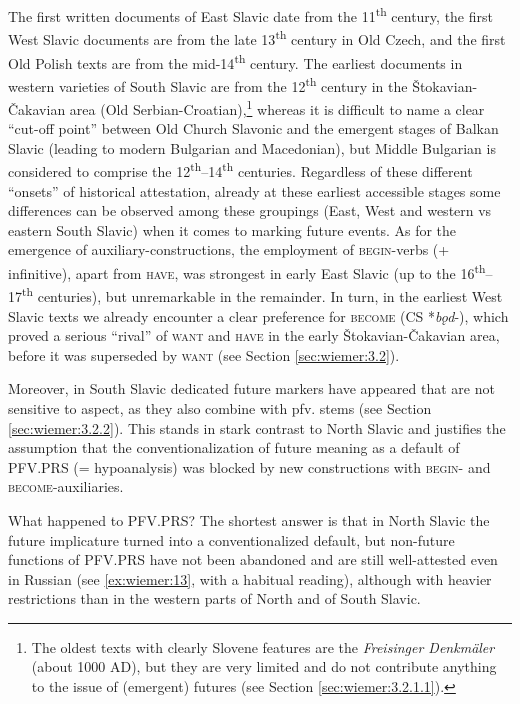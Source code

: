 \documentclass[output=paper,colorlinks,citecolor=brown]{langscibook}
\begin{document}
The first written documents of East Slavic date from the 11\textsuperscript{th} century, the first West Slavic documents are from the late 13\textsuperscript{th} century in Old Czech, and the first Old Polish texts are from the mid-14\textsuperscript{th} century. The earliest documents in western varieties of South Slavic are from the 12\textsuperscript{th} century in the Štokavian-Čakavian area (Old Serbian-Croatian),\footnote{\label{fn:14}The oldest texts with clearly Slovene features are the \textit{Freisinger Denkmäler} (about 1000 AD), but they are very limited and do not contribute anything to the issue of (emergent) futures (see Section \ref{sec:wiemer:3.2.1.1}).} whereas it is difficult to name a clear “cut-off point” between Old Church Slavonic and the emergent stages of Balkan Slavic (leading to modern Bulgarian and Macedonian), but Middle Bulgarian is considered to comprise the 12\textsuperscript{th}--14\textsuperscript{th} centuries. Regardless of these different “onsets” of historical attestation, already at these earliest accessible stages some differences can be observed among these groupings (East, West and western vs eastern South Slavic) when it comes to marking future events. As for the emergence of auxiliary-constructions, the employment of \textsc{begin}-verbs (+ infinitive), apart from \textsc{have}, was strongest in early East Slavic (up to the 16\textsuperscript{th}--17\textsuperscript{th} centuries), but unremarkable in the remainder. In turn, in the earliest West Slavic texts we already encounter a clear preference for \textsc{become} (CS *\textit{bǫd}-), which proved a serious “rival” of \textsc{want} and \textsc{have} in the early Štokavian-Čakavian area, before it was superseded by \textsc{want} (see Section \ref{sec:wiemer:3.2}). 

Moreover, in South Slavic dedicated future markers have appeared that are not sensitive to aspect, as they also combine with pfv. stems (see Section \ref{sec:wiemer:3.2.2}). This stands in stark contrast to North Slavic and justifies the assumption that the conventionalization of future meaning as a default of PFV.PRS (= hypoanalysis) was blocked by new constructions with \textsc{begin}- and \textsc{become}-auxiliaries. 

What happened to PFV.PRS? The shortest answer is that in North Slavic the future implicature turned into a conventionalized default, but non-future functions of PFV.PRS have not been abandoned and are still well-attested even in Russian (see \ref{ex:wiemer:13}, with a habitual reading), although with heavier restrictions than in the western parts of North and of South Slavic.
\end{document}
